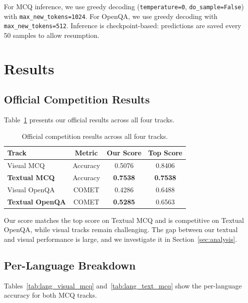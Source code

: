 \documentclass[]{ceurart}
\begin{document}
For MCQ inference, we use greedy decoding (\texttt{temperature=0}, \texttt{do\_sample=False}) with \texttt{max\_new\_tokens=1024}.
For OpenQA, we use greedy decoding with \texttt{max\_new\_tokens=512}.
Inference is checkpoint-based: predictions are saved every 50 samples to allow resumption.

\section{Results}
\label{sec:results}

\subsection{Official Competition Results}
\label{sec:official}

Table~\ref{tab:official} presents our official results across all four tracks.

\begin{table}[t]
\centering
\caption{Official competition results across all four tracks.}
\label{tab:official}
\begin{tabular}{lccc}
\toprule
\textbf{Track} & \textbf{Metric} & \textbf{Our Score} & \textbf{Top Score} \\
\midrule
Visual MCQ     & Accuracy & 0.5076 & 0.8406 \\
\textbf{Textual MCQ}    & Accuracy & \textbf{0.7538} & \textbf{0.7538} \\
Visual OpenQA  & COMET    & 0.4286 & 0.6488 \\
\textbf{Textual OpenQA} & COMET    & \textbf{0.5285} & 0.6563 \\
\bottomrule
\end{tabular}
\end{table}

Our score matches the top score on Textual MCQ and is competitive on Textual OpenQA, while visual tracks remain challenging.
The gap between our textual and visual performance is large, and we investigate it in Section~\ref{sec:analysis}.

\subsection{Per-Language Breakdown}
\label{sec:perlang}

Tables~\ref{tab:lang_visual_mcq} and~\ref{tab:lang_text_mcq} show the per-language accuracy for both MCQ tracks.
\end{document}
